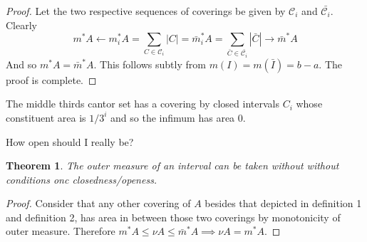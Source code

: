 \documentclass[letter]{article}
\newtheorem{theorem}{Theorem}
\newenvironment{menumerate}{%
  \edef\backupindent{\the\parindent}%
  \enumerate%
  \setlength{\parindent}{\backupindent}%
}{\endenumerate}
\begin{document}
\begin{menumerate}
\begin{menumerate}
\begin{proof}
			Let the two respective sequences of coverings be given by $\mathcal{C}_i$ and $\bar{\mathcal{C}_i}$. Clearly 
			\begin{equation}
				m^*A \leftarrow m_i^* A  = \sum_{C \in \mathcal{C}_i} |C| = \bar m_i^* A  =
				 \sum_{\bar C \in  \bar{\mathcal{C}_i}} |\bar C|\to \bar m^*A
			\end{equation}
			And so $m^*A = \bar m^*A.$ This follows subtly from $m(I) = m(\bar I) = b-a$. The proof is complete.
		\end{proof}
		\item The middle thirds cantor set has a covering by closed intervals 
		$C_i$ whose constituent area is $1/3^i$ and so the infimum has area $0.$
		\item How open should I really be? \begin{theorem}
			The outer measure of an interval can be taken without without conditions onc closedness/openess.
		\end{theorem}
		\begin{proof}
			Consider that any other covering of $A$ besides that depicted in definition 1 and definition 2, has area in between those two coverings by monotonicity of outer measure. Therefore $m^*A \leq \nu A \leq \bar m^* A \implies \nu A = m^* A.$
		\end{proof}


\end{menumerate}
\end{menumerate}
\end{document}
